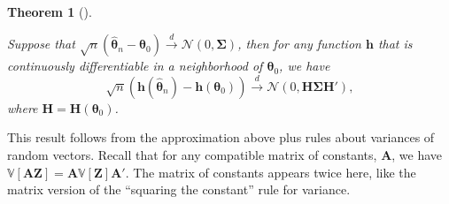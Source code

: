 \documentclass[
  13pt,
  letterpaper,
  DIV=11,
  numbers=noendperiod]{scrreprt}
\newcommand{\mb}{\bm}
\newcommand{\V}{\mathbb{V}}
\newcommand{\N}{\mathcal{N}}
\newcommand{\indist}{\overset{d}{\to}}
\theoremstyle{plain}
\newtheorem{theorem}{Theorem}[chapter]
\theoremstyle{plain}
\theoremstyle{definition}
\theoremstyle{definition}
\theoremstyle{remark}
\begin{document}
\begin{theorem}[]\protect\hypertarget{thm-multivariate-delta}{}\label{thm-multivariate-delta}

Suppose that
\(\sqrt{n}\left(\widehat{\mb{\theta}}_n - \mb{\theta}_0 \right) \indist \N(0, \mb{\Sigma})\),
then for any function \(\mb{h}\) that is continuously differentiable in
a neighborhood of \(\mb{\theta}_0\), we have \[
\sqrt{n}\left(\mb{h}(\widehat{\mb{\theta}}_n) - \mb{h}(\mb{\theta}_0) \right) \indist \N(0, \mb{H}\mb{\Sigma}\mb{H}'), 
\] where \(\mb{H} = \mb{H}(\mb{\theta}_0)\).

\end{theorem}

This result follows from the approximation above plus rules about
variances of random vectors. Recall that for any compatible matrix of
constants, \(\mb{A}\), we have
\(\V[\mb{A}\mb{Z}] = \mb{A}\V[\mb{Z}]\mb{A}'\). The matrix of constants
appears twice here, like the matrix version of the ``squaring the
constant'' rule for variance.
\end{document}
